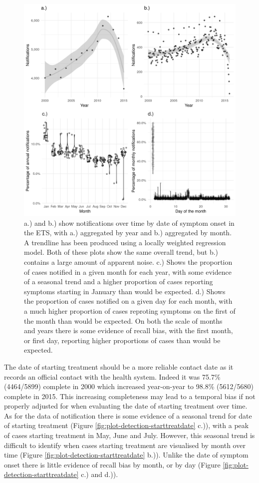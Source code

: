 \documentclass[11pt,twoside]{bristolthesis}
\begin{document}
  \begin{figure}
  
  {\centering \includegraphics[width=0.8\linewidth,]{chapters/tb-epi-england/figures/plot-detection-sympton} 
  
  }
  
  \caption[a.) and b.) show notifications over time by date of symptom onset in the ETS, with a.) aggregated by year and  b.) aggregated by month.]{a.) and b.) show notifications over time by date of symptom onset in the ETS, with a.) aggregated by year and  b.) aggregated by month. A trendline has been produced using a locally weighted regression model. Both of these plots show the same overall trend, but b.) contains a large amount of apparent noise. c.) Shows the proportion of cases notified in a given month for each year, with some evidence of a seasonal trend and a higher proportion of cases reporting symptoms starting in January than would be expected. d.) Shows the proportion of cases notified on a given day for each month, with a much higher proportion of cases reproting symptoms on the first of the month than would be expected. On both the scale of months and years there is some evidence of recall bias, with the first month, or first day, reporting higher proportions of cases than would be expected.}\label{fig:plot-detection-sympton}
  \end{figure}
  The date of starting treatment should be a more reliable contact date as it records an official contact with the health system. Indeed it was 75.7\% (4464/5899) complete in 2000 which increased year-on-year to 98.8\% (5612/5680) complete in 2015. This increasing completeness may lead to a temporal bias if not properly adjusted for when evaluating the date of starting treatment over time. As for the data of notification there is some evidence of a seasonal trend for date of starting treatment (Figure \ref{fig:plot-detection-starttreatdate} c.)), with a peak of cases starting treatment in May, June and July. However, this seasonal trend is difficult to identify when cases starting treatment are visualised by month over time (Figure \ref{fig:plot-detection-starttreatdate} b.)). Unlike the date of symptom onset there is little evidence of recall bias by month, or by day (Figure \ref{fig:plot-detection-starttreatdate} c.) and d.)).
\end{document}
